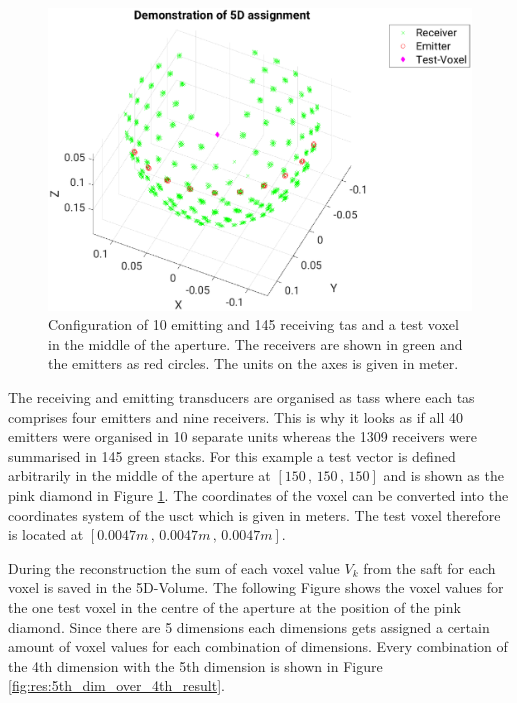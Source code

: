 \begin{figure}[H]
    \centering
    \includegraphics[width=0.89\linewidth]{Graphics/Results/4d_5d/5thDim_over_4thDim_150_150_150_apertur.eps}
    \caption{Configuration of 10 emitting and 145 receiving \ac{tas} and a test voxel in the middle of the aperture. The receivers are shown in green and the emitters as red circles. The units on the axes is given in meter. }
    \label{fig:res:5th_dim_over_4th_aperture}
\end{figure}

 The receiving and emitting transducers are organised as \acp{tas} where each \ac{tas} comprises four emitters and nine receivers. This is why it looks as if all 40 emitters were organised in 10 separate units whereas the 1309 receivers were summarised in 145 green stacks. 
 For this example a test vector is defined arbitrarily in the middle of the aperture at $[150\, , \, 150\, , \, 150]$ and is shown as the pink diamond in Figure \ref{fig:res:5th_dim_over_4th_aperture}. The coordinates of the voxel can be converted into the coordinates system of the \ac{usct} which is given in meters. The test voxel therefore is located at $[0.0047m\, , \, 0.0047m\, , \, 0.0047m]$.

 During the reconstruction the sum of each voxel value $V_k$ from the \ac{saft} for each voxel is saved in the 5D-Volume. The following Figure shows the voxel values for the one test voxel in the centre of the aperture at the position of the pink diamond. Since there are 5 dimensions each dimensions gets assigned a certain amount of voxel values for each combination of dimensions. Every combination of the 4th dimension with the 5th dimension is shown in Figure \ref{fig:res:5th_dim_over_4th_result}.
 
